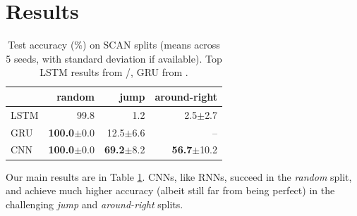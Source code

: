 \section{Results}
\label{sec:experiments}

\begin{table}[tb]
  \begin{footnotesize}
    \begin{center}
          \begin{tabular}{l | r | r | r}
             & \textbf{random} & \textbf{jump} & \textbf{around-right} \\ \hline
             LSTM & 99.8 & 1.2 & 2.5$\pm$2.7 \\
             GRU & \textbf{100.0}$\pm$0.0 & 12.5$\pm$6.6 & --  \\
             \hline
              CNN & \textbf{100.0}$\pm$0.0 & \textbf{69.2}$\pm$8.2 & \textbf{56.7}$\pm$10.2 \\
          \end{tabular} 
    \end{center}
  \end{footnotesize}
  \caption{Test accuracy (\%) on SCAN splits (means across 5 seeds,
    with standard deviation if available). Top LSTM results from
    /, GRU from
      .}
\label{table:main_results} 
\end{table}

Our main results are in Table \ref{table:main_results}. CNNs, like
RNNs, succeed in the \emph{random} split, and achieve much higher accuracy (albeit still far from being perfect)  in the challenging \emph{jump} and \emph{around-right}
splits.

